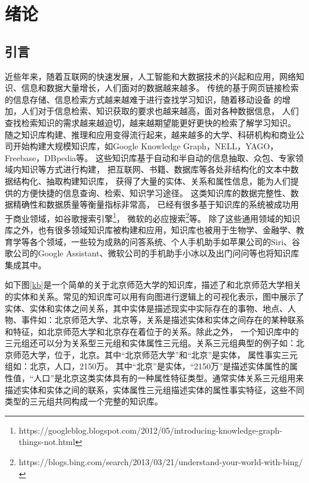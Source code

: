 

\chapter{绪论}
\label{cha:intro}
\section{引言}

近些年来，随着互联网的快速发展，人工智能和大数据技术的兴起和应用，网络知识、信息和数据大量增长，人们面对的数据越来越多。
传统的基于网页链接检索的信息存储、信息检索方式越来越难于进行查找学习知识，随着移动设备
的增加，人们对于信息检索、知识获取的要求也越来越高，面对各种数据信息，
人们查找检索知识的需求越来越迫切，越来越期望能更好更快的检索了解学习知识。
随之知识库构建、推理和应用变得流行起来，越来越多的大学、科研机构和商业公司开始构建大规模知识库，如Google Knowledge Graph\cite{Dong}，NELL\cite{NELL-aaai15}，YAGO\cite{Suchanek:2007:YCS:1242572.1242667}，
Freebase\cite{Bollacker2008FreebaseAC}，DBpedia\cite{Bizer:2009:DCP:1640541.1640848}等。
这些知识库基于自动和半自动的信息抽取、众包、专家领域内知识等方式进行构建，
把互联网、书籍、数据库等各处非结构化的文本中数据结构化、抽取构建知识库，
获得了大量的实体、关系和属性信息，能为人们提供的方便快捷的信息查询、检索、知识学习途径。
这类知识库的数据完整性、数据精确性和数据质量等衡量指标非常高，
已经有很多基于知识库的系统被成功用于商业领域，如谷歌搜索引擎\footnote{https://googleblog.blogspot.com/2012/05/introducing-knowledge-graph-things-not.html}，
微软的必应搜索\footnote{https://blogs.bing.com/search/2013/03/21/understand-your-world-with-bing/}等。
除了这些通用领域的知识库之外，也有很多领域知识库被构建和应用，知识库也被用于生物学\cite{Dumontier:2014:BRL:2878453.2878554}、金融学、教育学等各个领域，一些较为成熟的问答系统、个人手机助手如苹果公司的Siri、谷歌公司的Google Assistant、微软公司的手机助手小冰以及出门问问等也将知识库集成其中。

如下图\ref{kb}是一个简单的关于北京师范大学的知识库，描述了和北京师范大学相关的实体和关系。常见的知识库可以用有向图进行逻辑上的可视化表示，图中展示了实体、实体和实体之间关系，其中实体是描述现实中实际存在的事物、地点、人物、事件如：北京师范大学、北京等，关系是描述实体和实体之间存在的某种联系和特征，如北京师范大学和北京存在着位于的关系。除此之外，
一个知识库中的三元组还可以分为关系型三元组和实体属性三元组。关系三元组典型的例子如：北京师范大学，位于，北京。其中“北京师范大学”和“北京”是实体，
属性事实三元组如：北京，人口，2150万。
其中“北京”是实体，“2150万”是描述实体属性的属性值，“人口”是北京这类实体具有的一种属性特征类型。通常实体关系三元组用来描述实体和实体之间的联系，实体属性三元组描述实体的属性事实特征，这些不同类型的三元组共同构成一个完整的知识库。


